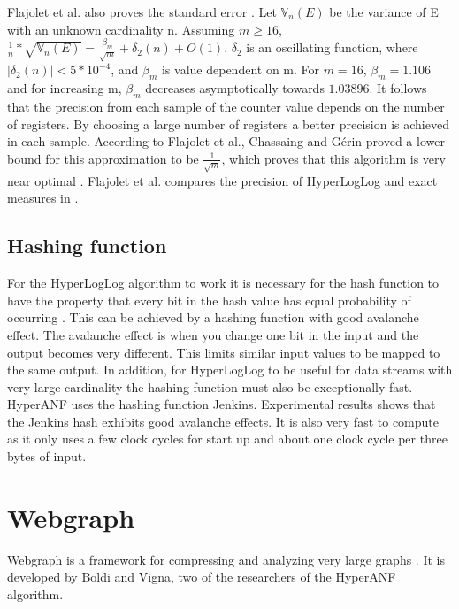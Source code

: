 Flajolet et al. also proves the standard error \cite{hyperloglog}. Let $\mathbb{V}_n(E)$ be the variance of E with an unknown cardinality n. Assuming $m \geq 16$,  $\frac{1}{n}*\sqrt{\mathbb{V}_n(E)} = \frac{\beta_m}{\sqrt{m}}  + \delta_2(n) + O(1)$. $\delta_2$ is an oscillating function, where $|\delta_2(n)| < 5*10^{-4}$, and $\beta_m$ is value dependent on m. For $m = 16$, $\beta_m = 1.106$ and for increasing m, $\beta_m$ decreases asymptotically towards $1.03896$. It follows that the precision from each sample of the counter value depends on the number of registers. By choosing a large number of registers a better precision is achieved in each sample. According to Flajolet et al., Chassaing and Gérin proved a lower bound for this approximation to be $\frac{1}{\sqrt{m}}$, which proves that this algorithm is very near optimal \cite{nearopt}. Flajolet et al. compares the precision of HyperLogLog and exact measures in \cite{hyperloglog}.

\subsection{Hashing function}
For the HyperLogLog algorithm to work it is necessary for the hash function to have the property that every bit in the hash value has equal probability of occurring \cite{hyperloglog}. This can be achieved by a hashing function with good avalanche effect. The avalanche effect is when you change one bit in the input and the output becomes very different. This limits similar input values to be mapped to the same output. In addition, for HyperLogLog to be useful for data streams with very large cardinality the hashing function must also be exceptionally fast. HyperANF uses the hashing function Jenkins. Experimental results shows that the Jenkins hash exhibits good avalanche effects. It is also very fast to compute as it only uses a few clock cycles for start up and about one clock cycle per three bytes of input.

\iffalse
\subsection{BroadWord}
Broadword is a way to do several calculations at the same time using cleverly constructed binary-logic expressions. HyperANF uses broadword to take the union $U$ of two HyperLogLog counters $A$ and $B$, which effectively is taking $\forall i; U_i = max(A_i,B_i)$
\fi

\section{Webgraph}
Webgraph is a framework for compressing and analyzing very large graphs \cite{webgraph-compression}. It is developed by Boldi and Vigna, two of the researchers of the HyperANF algorithm.



